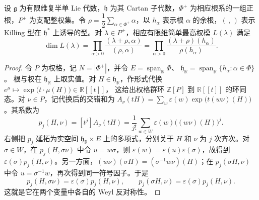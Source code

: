 \begin{theorem}\label{b5:thm:weyl-dimension}
	设 \(\mathfrak g\) 为有限维复半单 Lie 代数，\(\mathfrak h\) 为其 Cartan 子代数，\(\Phi^+\) 为相应根系的一组正根，\(P^+\) 为支配整权集。令 \(\rho=\dfrac12\sum_{\alpha\in\Phi^+}\alpha\)，以 \(h_\alpha\) 表示根 \(\alpha\) 的余根，\((\, ,\,)\) 表示 Killing 型在 \(\mathfrak h^*\) 上诱导的型。对 \(\lambda\in P^+\)，相应有限维简单最高权模 \(L(\lambda)\) 满足
	\begin{equation}\label{b5:eq:weyl-dimension}
		\dim L(\lambda) =\prod_{\alpha>0}\frac{(\lambda+\rho,\alpha)}{(\rho,\alpha)} =\prod_{\alpha>0}\frac{(\lambda+\rho)(h_\alpha)}{\rho(h_\alpha)}.
	\end{equation}
\end{theorem}
\begin{proof}
	令 \(P\) 为权格，记 \(N=|\Phi^+|\)，并令 \(E=\operatorname{span}_{\mathbb R}\Phi\)、 \(\mathfrak h_{\mathbb R}=\operatorname{span}_{\mathbb R}\{h_\alpha:\alpha\in\Phi\}\)。 根与权在 \(\mathfrak h_{\mathbb R}\) 上取实值。对 \(H\in\mathfrak h_{\mathbb R}\)，作形式代换 \(e^\mu\mapsto\exp\bigl(t\cdot\mu(H)\bigr)\in\mathbb R[\![t]\!]\)， 这给出权格群环 \(\mathbb Z[P]\) 到 \(\mathbb R[\![t]\!]\) 的环同态。对 \(\nu\in P\)，记代换后的交错和为 \(A_\nu(tH)=\sum_w\varepsilon(w)\exp\bigl(t(w\nu)(H)\bigr)\)。其系数为
	\[
		p_j(H,\nu)=[t^j]A_\nu(tH) =\frac1{j!}\sum_{w\in W}\varepsilon(w)\bigl((w\nu)(H)\bigr)^j.
	\]
	右侧把 \(p_j\) 延拓为实空间 \(\mathfrak h_{\mathbb R}\times E\) 上的多项式，分别关于 \(H\) 和 \(\nu\) 为 \(j\) 次齐次。对 \(\sigma\in W\)，在 \(p_j(H,\sigma\nu)\) 中令 \(u=w\sigma\)，则 \(\varepsilon(w)=\varepsilon(u)\varepsilon(\sigma)\)，故得到 \(\varepsilon(\sigma)p_j(H,\nu)\)。另一方面，\((w\nu)(\sigma H)=(\sigma^{-1}w\nu)(H)\)；在 \(p_j(\sigma H,\nu)\) 中令 \(u=\sigma^{-1}w\)，再次得到同一符号因子。于是
	\[
		p_j(H,\sigma\nu)=\varepsilon(\sigma)p_j(H,\nu),\qquad p_j(\sigma H,\nu)=\varepsilon(\sigma)p_j(H,\nu).
	\]
	这就是它在两个变量中各自的 Weyl 反对称性。


\end{proof}
